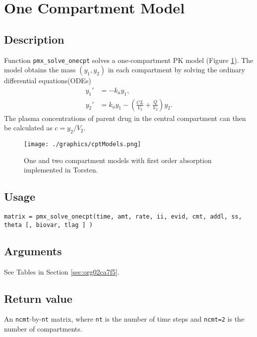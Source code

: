 \documentclass[12pt, reqno, oneside]{amsbook}
\numberwithin{equation}{chapter}
\numberwithin{figure}{chapter}
\numberwithin{table}{chapter}
\theoremstyle{remark}
\begin{document}
\section{One Compartment Model}
\label{sec:org3b765d9}
\subsection{Description}
\label{sec:orge64adf8}
Function \texttt{pmx\_solve\_onecpt} solves a one-compartment PK
model (Figure \ref{one_two_cpt_models}). The model obtains the mass \((y_1, y_2)\) in each compartment
by solving the ordinary differential equations(ODEs)
\begin{align}\label{eq:onecpt}
  y_1' &= -k_a y_1, \\
  y_2' &= k_a y_1 - \left(\frac{CL}{V_2} + \frac{Q}{V_2}\right) y_2.
\end{align}
The plasma concentrations of parent drug in the central compartment
can then be calculated as \(c=y_2/V_2\).

\begin{figure}[htbp]
\centering
\texttt{[image: ./graphics/cptModels.png]}
\caption{\label{one_two_cpt_models}One and two compartment models with first order absorption implemented in Torsten.}
\end{figure}

\subsection{Usage}
\label{sec:orgf3012f2}
\begin{verbatim}
matrix = pmx_solve_onecpt(time, amt, rate, ii, evid, cmt, addl, ss, theta [, biovar, tlag ] )
\end{verbatim}

\subsection{Arguments}
\label{sec:org10352e3}
See Tables in Section \ref{sec:org02ca7f5}.
\subsection{Return value}
\label{sec:org649e9bd}
An \texttt{ncmt}-by-\texttt{nt} matrix, where \texttt{nt} is the number of time steps and \texttt{ncmt=2} is the number of compartments.
\end{document}
